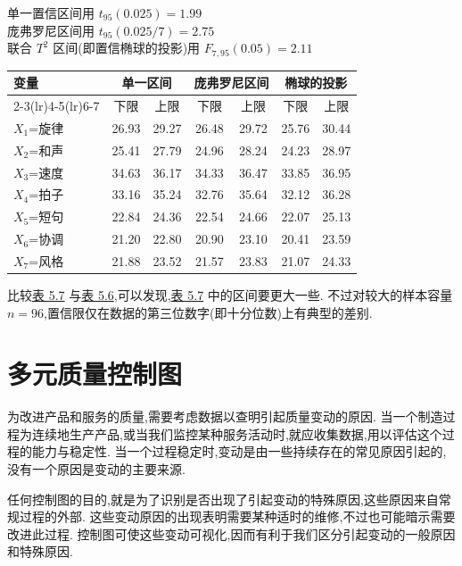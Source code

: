 \begin{mvtable}
\label{tab:5.7}
\begin{center}\small
单一置信区间用 $t_{95}(0.025)=1.99$\\
庞弗罗尼区间用 $t_{95}(0.025/7)=2.75$\\
联合 $T^{2}$ 区间(即置信椭球的投影)用 $F_{7,95}(0.05)=2.11$
\end{center}
\begin{tabular}{lcccccc}
\toprule
\multirow{2}{*}{变量} & \multicolumn{2}{c}{单一区间} & \multicolumn{2}{c}{庞弗罗尼区间} & \multicolumn{2}{c}{椭球的投影}\\
\cmidrule(lr){2-3}\cmidrule(lr){4-5}\cmidrule(lr){6-7}
 & 下限 & 上限 & 下限 & 上限 & 下限 & 上限\\
\midrule
$X_1$=旋律 & 26.93 & 29.27 & 26.48 & 29.72 & 25.76 & 30.44\\
$X_2$=和声 & 25.41 & 27.79 & 24.96 & 28.24 & 24.23 & 28.97\\
$X_3$=速度 & 34.63 & 36.17 & 34.33 & 36.47 & 33.85 & 36.95\\
$X_4$=拍子 & 33.16 & 35.24 & 32.76 & 35.64 & 32.12 & 36.28\\
$X_5$=短句 & 22.84 & 24.36 & 22.54 & 24.66 & 22.07 & 25.13\\
$X_6$=协调 & 21.20 & 22.80 & 20.90 & 23.10 & 20.41 & 23.59\\
$X_7$=风格 & 21.88 & 23.52 & 21.57 & 23.83 & 21.07 & 24.33\\
\bottomrule
\end{tabular}
\end{mvtable}

比较\hyperref[tab:5.7]{表 5.7} 与\hyperref[tab:5.6]{表 5.6},可以发现,\hyperref[tab:5.7]{表 5.7} 中的区间要更大一些. 不过对较大的样本容量 $n=96$,置信限仅在数据的第三位数字(即十分位数)上有典型的差别.

\section{多元质量控制图}
\label{sec:5.6}

为改进产品和服务的质量,需要考虑数据以查明引起质量变动的原因. 当一个制造过程为连续地生产产品,或当我们监控某种服务活动时,就应收集数据,用以评估这个过程的能力与稳定性. 当一个过程稳定时,变动是由一些持续存在的常见原因引起的,没有一个原因是变动的主要来源.

任何控制图的目的,就是为了识别是否出现了引起变动的特殊原因,这些原因来自常规过程的外部. 这些变动原因的出现表明需要某种适时的维修,不过也可能暗示需要改进此过程. 控制图可使这些变动可视化,因而有利于我们区分引起变动的一般原因和特殊原因.

